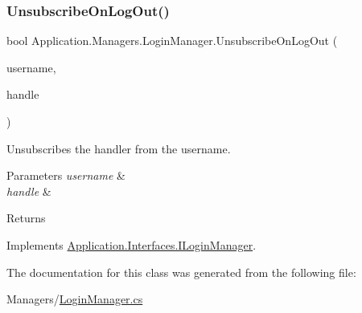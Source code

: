 \subsubsection{\texorpdfstring{Unsubscribe\+On\+Log\+Out()}{UnsubscribeOnLogOut()}}
{\footnotesize\ttfamily bool Application.\+Managers.\+Login\+Manager.\+Unsubscribe\+On\+Log\+Out (\begin{DoxyParamCaption}\item[{string}]{username,  }\item[{User\+Logged\+Out\+Handle}]{handle }\end{DoxyParamCaption})}



Unsubscribes the handler from the username. 


\begin{DoxyParams}{Parameters}
{\em username} & \\
\hline
{\em handle} & \\
\hline
\end{DoxyParams}
\begin{DoxyReturn}{Returns}

\end{DoxyReturn}


Implements \mbox{\hyperlink{interface_application_1_1_interfaces_1_1_i_login_manager_aeb60a7935fa777e629db6098ce2f458d}{Application.\+Interfaces.\+I\+Login\+Manager}}.



The documentation for this class was generated from the following file\+:\begin{DoxyCompactItemize}
\item 
Managers/\mbox{\hyperlink{_login_manager_8cs}{Login\+Manager.\+cs}}\end{DoxyCompactItemize}
